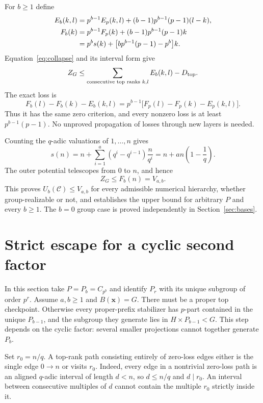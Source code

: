 \documentclass[11pt,letterpaper]{article}
\theoremstyle{definition}\newtheorem{definition}{Definition}
\newcommand{\C}{\mathcal C}
\begin{document}
For $b\ge1$ define
\begin{align}
E_b(k,l)&=p^{b-1}E_p(k,l)+(b-1)p^{b-1}(p-1)(l-k),\label{eq:collapsededge}\\
F_b(k)&=p^{b-1}F_p(k)+(b-1)p^{b-1}(p-1)k\notag\\
&=p^bs(k)+\bigl[bp^{b-1}(p-1)-p^b\bigr]k.\label{eq:collapsedpotential}
\end{align}
Equation~\eqref{eq:collapse} and its interval form give
\begin{equation}
Z_G\le\sum_{\text{consecutive top ranks }k,l}E_b(k,l)-D_{\rm top}.\label{eq:outerbound}
\end{equation}
The exact loss is
\begin{equation}
F_b(l)-F_b(k)-E_b(k,l)=p^{b-1}\bigl[F_p(l)-F_p(k)-E_p(k,l)\bigr].\label{eq:scaledloss}
\end{equation}
Thus it has the same zero criterion, and every nonzero loss is at least $p^{b-1}(p-1)$. No unproved propagation of losses through new layers is needed.

Counting the $q$-adic valuations of $1,\ldots,n$ gives
\[
s(n)=n+\sum_{i=1}^{a}(q^i-q^{i-1})\frac{n}{q^i}
=n+an\left(1-\frac1q\right).
\]
The outer potential telescopes from $0$ to $n$, and hence
\begin{equation}
Z_G\le F_b(n)=V_{a,b}.\label{eq:upper}
\end{equation}
This proves $U_b(\C)\le V_{a,b}$ for every admissible numerical hierarchy, whether group-realizable or not, and establishes the upper bound for arbitrary $P$ and every $b\ge1$. The $b=0$ group case is proved independently in Section~\ref{sec:bases}.

\section{Strict escape for a cyclic second factor}\label{sec:escape}
In this section take $P=P_b=C_{p^b}$ and identify $P_r$ with its unique subgroup of order $p^r$. Assume $a,b\ge1$ and $B(\mathbf{x})=G$. There must be a proper top checkpoint. Otherwise every proper-prefix stabilizer has $p$-part contained in the unique $P_{b-1}$, and the subgroup they generate lies in $H\times P_{b-1}<G$. This step depends on the cyclic factor: several smaller projections cannot together generate $P_b$.

Set $r_0=n/q$. A top-rank path consisting entirely of zero-loss edges either is the single edge $0\to n$ or visits $r_0$. Indeed, every edge in a nontrivial zero-loss path is an aligned $q$-adic interval of length $d<n$, so $d\le n/q$ and $d\mid r_0$. An interval between consecutive multiples of $d$ cannot contain the multiple $r_0$ strictly inside it.
\end{document}
